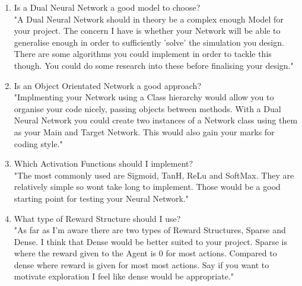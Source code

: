 \begin{flushleft}
\begin{enumerate}
                    \item Is a Dual Neural Network a good model to choose? \\
                        \vspace{0.2cm}
                        "A Dual Neural Network should in theory be a complex enough Model for your project. The concern I have is whether your
                        Network will be able to generalise enough in order to sufficiently 'solve' the simulation you design. There are some
                        algorithms you could implement in order to tackle this though. You could do some research into these before finalising 
                        your design."

                    \item Is an Object Orientated Network a good approach? \\
                        \vspace{0.2cm}
                        "Implmenting your Network using a Class hierarchy would allow you to organise your code nicely, passing objects between
                        methods. With a Dual Neural Network you could create two instances of a Network class using them as your Main and Target 
                        Network. This would also gain your marks for coding style."

                    \item Which Activation Functions should I implement? \\
                        \vspace{0.2cm}
                        "The most commonly used are Sigmoid, TanH, ReLu and SoftMax. They are relatively simple so wont take long to implement.
                        Those would be a good starting point for testing your Neural Network."
                    
                    \item What type of Reward Structure should I use? \\
                        \vspace{0.2cm}
                        "As far as I'm aware there are two types of Reward Structures, Sparse and Dense. I think that Dense would be better suited
                        to your project. Sparse is where the reward given to the Agent is 0 for most actions. Compared to dense where reward
                        is given for most most actions. Say if you want to motivate exploration I feel like dense would be appropriate."


\end{enumerate}
\end{flushleft}
